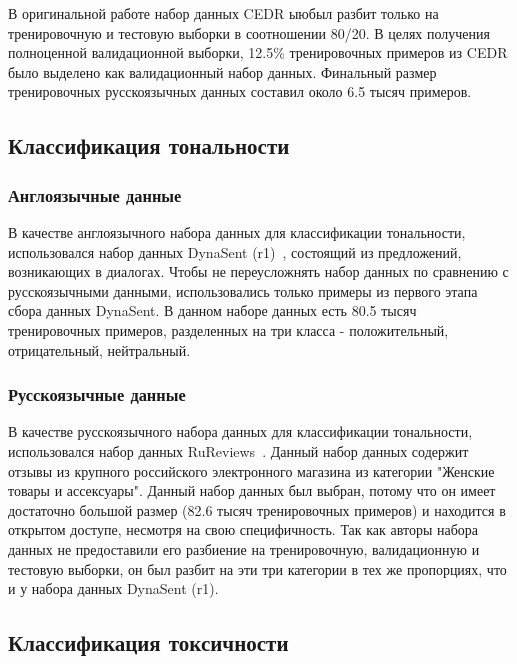 В оригинальной работе набор данных CEDR ыюбыл разбит только на тренировочную и тестовую выборки в соотношении 80/20. В целях получения полноценной валидационной выборки, 12.5\% тренировочных примеров из CEDR было выделено как валидационный набор данных. Финальный размер тренировочных русскоязычных данных составил около 6.5 тысяч примеров.


\subsection{Классификация тональности}

\subsubsection{Англоязычные данные} 
В качестве англоязычного набора данных для классификации тональности, использовался набор данных {DynaSent} (r1)~\cite{sentiment}, состоящий из предложений, возникающих в диалогах. Чтобы не переусложнять набор данных по сравнению с русскоязычными данными, использовались только примеры из первого этапа сбора данных DynaSent. В данном наборе данных есть 80.5 тысяч тренировочных примеров, разделенных на три класса - положительный, отрицательный, нейтральный.

\subsubsection{Русскоязычные данные} 
В качестве русскоязычного набора данных для классификации тональности, использовался набор данных {RuReviews}~\cite{ru_sentiment}. Данный набор данных содержит отзывы из крупного российского электронного магазина из категории "Женские товары и ассексуары". Данный набор данных был выбран, потому что он имеет достаточно большой размер (82.6 тысяч тренировочных примеров) и находится в открытом доступе, несмотря на свою специфичность. Так как авторы набора данных не предоставили его разбиение на тренировочную, валидационную и тестовую выборки, он был разбит на эти три категории в тех же пропорциях, что и у набора данных
 {DynaSent} (r1).

\subsection{Классификация токсичности}
